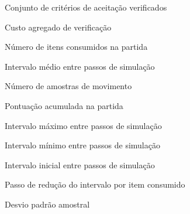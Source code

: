 \begin{simbolos}
	\item[$A$] Conjunto de critérios de aceitação verificados
	\item[$C$] Custo agregado de verificação
	\item[$e$] Número de itens consumidos na partida
	\item[$\mathrm{E}{[}T{]}$] Intervalo médio entre passos de simulação
	\item[$m$] Número de amostras de movimento
	\item[$s$] Pontuação acumulada na partida
	\item[$t_{\max}$] Intervalo máximo entre passos de simulação
	\item[$t_{\min}$] Intervalo mínimo entre passos de simulação
	\item[$t_0$] Intervalo inicial entre passos de simulação
	\item[$\Delta$] Passo de redução do intervalo por item consumido
	\item[$\sigma$] Desvio padrão amostral
\end{simbolos}

\tableofcontents*
\newpage
